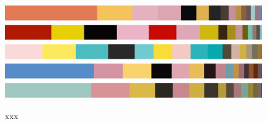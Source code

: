 \documentclass{article}
\begin{document}
\begin{figure}[htbp]
    \centering
        {\includegraphics[width=\textwidth]{main_files/figure-latex/7_1_orange_marilyn_color_ribbon.pdf}}
        {\includegraphics[width=\textwidth]{main_files/figure-latex/7_2_red_marilyn_color_ribbon.pdf}}
        {\includegraphics[width=\textwidth]{main_files/figure-latex/7_3_turq_marilyn_color_ribbon.pdf}}
        {\includegraphics[width=\textwidth]{main_files/figure-latex/7_4_blue_marilyn_color_ribbon.pdf}}
        {\includegraphics[width=\textwidth]{main_files/figure-latex/7_5_eggblue_marilyn_color_ribbon.pdf}}
    \caption{xxx}
\end{figure}
\end{document}
